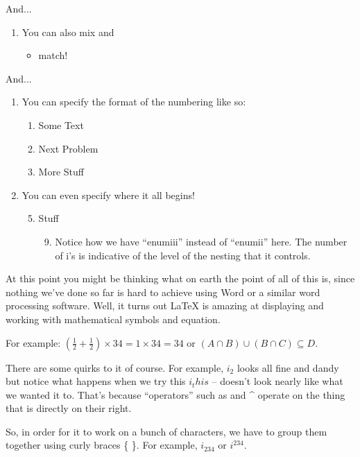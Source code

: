 \documentclass{article}
\begin{document}
And...

\begin{enumerate}
  \item You can also mix and
  \begin{itemize}
    \item match!
  \end{itemize}
\end{enumerate}

And...

\begin{enumerate}
  \item You can specify the format of the numbering like so:
  \begin{enumerate}[Problem 1.]
    \item Some Text
    \item Next Problem
    \item More Stuff
  \end{enumerate}
  \item You can even specify where it all begins!
  \begin{enumerate}
    \setcounter{enumii}{4}
    \item Stuff
    \begin{enumerate}
      \setcounter{enumiii}{8}
      \item Notice how we have ``enumiii'' instead of ``enumii'' here. The
      number of i's is indicative of the level of the nesting that it controls.
    \end{enumerate}
  \end{enumerate}
\end{enumerate}

At this point you might be thinking what on earth the point of all of this is,
since nothing we've done so far is hard to achieve using Word or a similar
word processing software. Well, it turns out \LaTeX{} \@ is amazing at displaying
and working with mathematical symbols and equation.

For example: $(\frac{1}{2} + \frac{1}{2}) \times 34 = 1 \times 34 = 34$ or
$(A \cap B) \cup (B \cap C) \subseteq D$.

There are some quirks to it of course. For example, $i_2$ looks all fine and
dandy but notice what happens when we try this $i_this$ -- doesn't look nearly
like what we wanted it to. That's because ``operators'' such as
\textunderscore{} and \^{} operate on the thing that is directly on their right.


So, in order for it to work on a bunch of characters, we have to group them
together using curly braces \{ \}. For example, $i_{234}$ or $i^{234}$.
\end{document}
